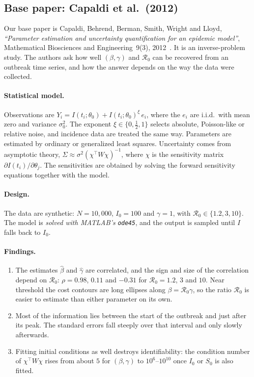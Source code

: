 \documentclass[sigconf]{acmart}
\begin{document}
\subsection{Base paper: Capaldi et al.\ (2012)}
Our base paper is Capaldi, Behrend, Berman, Smith, Wright and Lloyd,
\emph{``Parameter estimation and uncertainty quantification for an
epidemic model''}, Mathematical Biosciences and
Engineering~9(3), 2012~\cite{capaldi2012}. It is an inverse-problem
study. The authors ask how well $(\beta,\gamma)$ and $\mathcal{R}_0$ can
be recovered from an outbreak time series, and how the answer depends on
the way the data were collected.

\paragraph{Statistical model.} Observations are
$Y_i = I(t_i;\theta_0) + I(t_i;\theta_0)^{\xi}\,e_i$, where the $e_i$
are i.i.d.\ with mean zero and variance $\sigma_0^2$. The exponent
$\xi\in\{0,\tfrac12,1\}$ selects absolute, Poisson-like or relative
noise, and incidence data are treated the same way. Parameters are
estimated by ordinary or generalized least squares. Uncertainty comes
from asymptotic theory, $\Sigma\approx\sigma^2(\chi^\top W\chi)^{-1}$,
where $\chi$ is the sensitivity matrix $\partial I(t_i)/\partial\theta_j$.
The sensitivities are obtained by solving the forward sensitivity
equations together with the model.

\paragraph{Design.} The data are synthetic: $N=10{,}000$, $I_0=100$ and
$\gamma=1$, with $\mathcal{R}_0\in\{1.2,3,10\}$. The model is
\emph{solved with MATLAB's \texttt{ode45}}, and the output is sampled
until $I$ falls back to $I_0$.

\paragraph{Findings.}
\begin{enumerate}
  \item The estimates $\hat\beta$ and $\hat\gamma$ are correlated, and
    the sign and size of the correlation depend on $\mathcal{R}_0$:
    $\rho=0.98$, $0.11$ and $-0.31$ for $\mathcal{R}_0=1.2$, $3$ and
    $10$. Near threshold the cost contours are long ellipses along
    $\beta=\mathcal{R}_0\gamma$, so the ratio $\mathcal{R}_0$ is easier
    to estimate than either parameter on its own.
  \item Most of the information lies between the start of the outbreak
    and just after its peak. The standard errors fall steeply over that
    interval and only slowly afterwards.
  \item Fitting initial conditions as well destroys identifiability: the
    condition number of $\chi^\top W\chi$ rises from about $5$ for
    $(\beta,\gamma)$ to $10^{6}$--$10^{10}$ once $I_0$ or $S_0$ is also
    fitted.
\end{enumerate}
\end{document}
